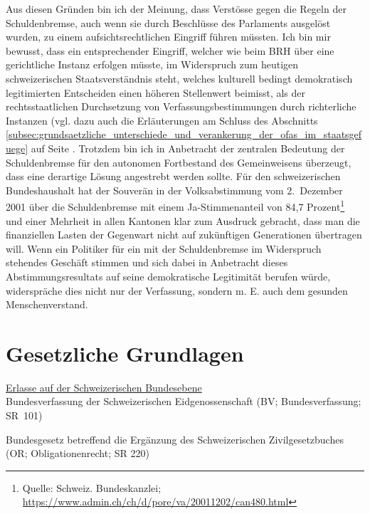\documentclass[10pt]{article}
\begin{document}
Aus diesen Gründen bin ich der Meinung, dass Verstösse gegen die Regeln der Schuldenbremse, auch wenn sie durch Beschlüsse des Parlaments ausgelöst wurden, zu einem aufsichtsrechtlichen Eingriff führen müssten. Ich bin mir bewusst, dass ein entsprechender Eingriff, welcher wie beim BRH über eine gerichtliche Instanz erfolgen müsste, im Widerspruch zum heutigen schweizerischen Staatsverständnis steht, welches kulturell bedingt demokratisch legitimierten Entscheiden einen höheren Stellenwert beimisst, als der rechtsstaatlichen Durchsetzung von Verfassungsbestimmungen durch richterliche Instanzen (vgl. dazu auch die Erläuterungen am Schluss des Abschnitts \ref{subsec:grundsaetzliche_unterschiede_und_verankerung_der_ofas_im_staatsgefuege} auf Seite \pageref{subsec:grundsaetzliche_unterschiede_und_verankerung_der_ofas_im_staatsgefuege}. Trotzdem bin ich in Anbetracht der zentralen Bedeutung der Schuldenbremse für den autonomen Fortbestand des Gemeinweisens überzeugt, dass eine derartige Lösung angestrebt werden sollte. Für den schweizerischen Bundeshaushalt hat der Souverän in der Volksabstimmung vom 2.~Dezember 2001 über die Schuldenbremse mit einem Ja-Stimmenanteil von 84,7 Prozent\footnote{Quelle: Schweiz. Bundeskanzlei; \href{https://www.admin.ch/ch/d/pore/va/20011202/can480.html}{https://www.admin.ch/ch/d/pore/va/20011202/can480.html}} und einer Mehrheit in allen Kantonen klar zum Ausdruck gebracht, dass man die finanziellen Lasten der Gegenwart nicht auf zukünftigen Generationen übertragen will. Wenn ein Politiker für ein mit der Schuldenbremse im Widerspruch stehendes Geschäft stimmen und sich dabei in Anbetracht dieses Abstimmungsresultats auf seine demokratische Legitimität berufen würde, widerspräche dies nicht nur der Verfassung, sondern m. E. auch dem gesunden Menschenverstand.

\newpage
\renewcommand{\refname}{Literaturverzeichnis}
\printbibliography
\newpage
\section*{Gesetzliche Grundlagen}\label{sec:gesetzliche_grundlagen}
\underline{Erlasse auf der Schweizerischen Bundesebene}\\
Bundesverfassung der Schweizerischen Eidgenossenschaft (BV; Bundesverfassung; SR~101)

Bundesgesetz betreffend die Ergänzung des Schweizerischen Zivilgesetzbuches (OR; Obligationenrecht; SR 220)
\end{document}
